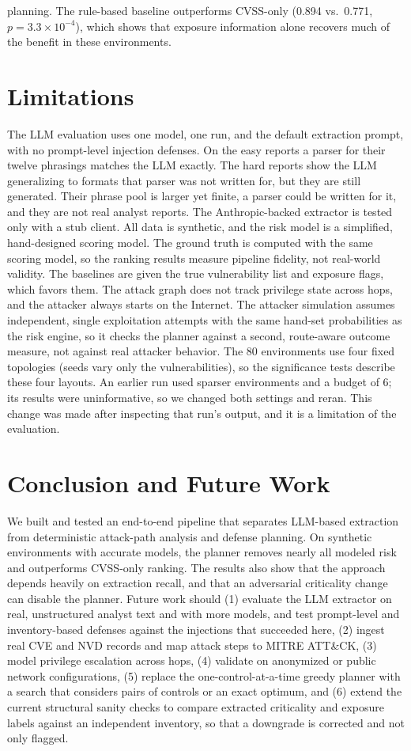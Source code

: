 \documentclass[11pt]{article}
\begin{document}
planning. The rule-based baseline outperforms CVSS-only (0.894 vs.\ 0.771, $p = 3.3 \times 10^{-4}$), which shows that exposure information alone recovers much of the benefit in these environments.

\section{Limitations}
The LLM evaluation uses one model, one run, and the default extraction prompt, with no prompt-level injection defenses. On the easy reports a parser for their twelve phrasings matches the LLM exactly. The hard reports show the LLM generalizing to formats that parser was not written for, but they are still generated. Their phrase pool is larger yet finite, a parser could be written for it, and they are not real analyst reports. The Anthropic-backed extractor is tested only with a stub client. All data is synthetic, and the risk model is a simplified, hand-designed scoring model. The ground truth is computed with the same scoring model, so the ranking results measure pipeline fidelity, not real-world validity. The baselines are given the true vulnerability list and exposure flags, which favors them. The attack graph does not track privilege state across hops, and the attacker always starts on the Internet. The attacker simulation assumes independent, single exploitation attempts with the same hand-set probabilities as the risk engine, so it checks the planner against a second, route-aware outcome measure, not against real attacker behavior. The 80 environments use four fixed topologies (seeds vary only the vulnerabilities), so the significance tests describe these four layouts. An earlier run used sparser environments and a budget of 6; its results were uninformative, so we changed both settings and reran. This change was made after inspecting that run's output, and it is a limitation of the evaluation.

\section{Conclusion and Future Work}
We built and tested an end-to-end pipeline that separates LLM-based extraction from deterministic attack-path analysis and defense planning. On synthetic environments with accurate models, the planner removes nearly all modeled risk and outperforms CVSS-only ranking. The results also show that the approach depends heavily on extraction recall, and that an adversarial criticality change can disable the planner. Future work should (1) evaluate the LLM extractor on real, unstructured analyst text and with more models, and test prompt-level and inventory-based defenses against the injections that succeeded here, (2) ingest real CVE and NVD records and map attack steps to MITRE ATT\&CK, (3) model privilege escalation across hops, (4) validate on anonymized or public network configurations, (5) replace the one-control-at-a-time greedy planner with a search that considers pairs of controls or an exact optimum, and (6) extend the current structural sanity checks to compare extracted criticality and exposure labels against an independent inventory, so that a downgrade is corrected and not only flagged.
\end{document}
